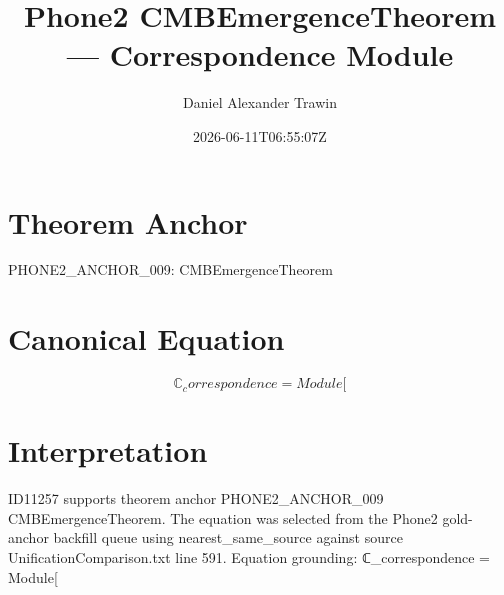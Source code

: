 \documentclass[11pt]{article}
\title{Phone2 CMBEmergenceTheorem — Correspondence Module}
\author{Daniel Alexander Trawin}
\date{2026-06-11T06:55:07Z}
\begin{document}
\maketitle
\section*{Theorem Anchor}
PHONE2_ANCHOR_009: CMBEmergenceTheorem
\section*{Canonical Equation}
\[
ℂ_correspondence = Module[
\]
\section*{Interpretation}
ID11257 supports theorem anchor PHONE2_ANCHOR_009 CMBEmergenceTheorem. The equation was selected from the Phone2 gold-anchor backfill queue using nearest_same_source against source UnificationComparison.txt line 591. Equation grounding: ℂ_correspondence = Module[
\end{document}
